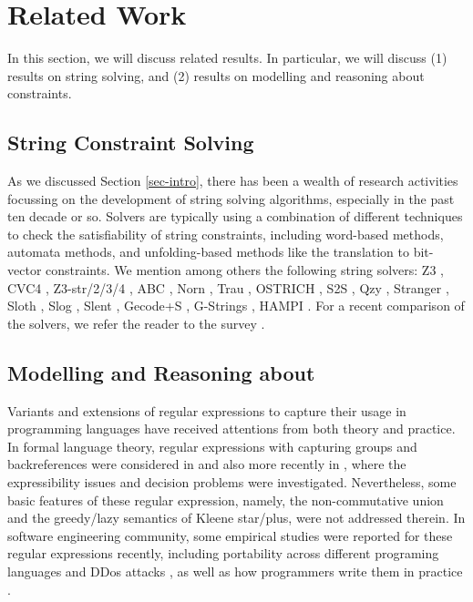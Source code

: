 \section{Related Work}
\label{sec-related}

In this section, we will discuss related results. In particular, we will discuss
(1) results on string solving, and (2) results on modelling and reasoning about 
\regexp{} constraints. 

\subsection{String Constraint Solving}
As we discussed Section \ref{sec-intro}, there has been a wealth of research
activities focussing on the development of string solving algorithms, especially
in the past ten decade or so. Solvers are typically using a combination
of different techniques to check the satisfiability of string constraints,
including word-based methods, automata methods, and unfolding-based methods
like the translation to bit-vector constraints.
We mention among others the following string solvers:
Z3 \cite{Z3}, CVC4 \cite{cvc4}, Z3-str/2/3/4 \cite{Z3-str,Z3-str2,Z3-str3,BerzishMurphy2021},
 ABC \cite{ABC}, Norn
\cite{Abdulla14}, Trau \cite{Z3-trau,AbdullaACDHRR18-trau,Abdulla17}, OSTRICH
\cite{CHL+19}, S2S \cite{DBLP:conf/aplas/LeH18}, Qzy \cite{cox2017model}, Stranger \cite{Stranger}, Sloth
\cite{HJLRV18,AbdullaA+19},
Slog \cite{fang-yu-circuits}, Slent \cite{WC+18}, Gecode+S \cite{DBLP:conf/cpaior/ScottFPS17}, G-Strings \cite{DBLP:conf/cp/AmadiniGST17}, HAMPI
\cite{HAMPI}. For a recent comparison of the solvers, we refer the
reader to the survey \cite{Ama20}.

\subsection{Modelling and Reasoning about \regexp{}}

Variants and extensions of regular expressions to capture their usage in programming languages have received attentions %
from both theory and practice. In formal language theory, regular expressions with capturing groups and backreferences were considered in \cite{CSY03,CN09} and also more recently in \cite{Freydenberger13,Schmid16,BM17b,FS19}, where the expressibility issues and decision problems were investigated. Nevertheless, some basic features of these regular expression, namely, the non-commutative union and the greedy/lazy semantics of Kleene star/plus, were not addressed therein. In software engineering community, %
some empirical studies were reported for these regular expressions recently, including portability across different programing languages \cite{DMC+19} and DDos attacks \cite{SP18}, as well as how programmers write them in practice \cite{MDD+19}.


